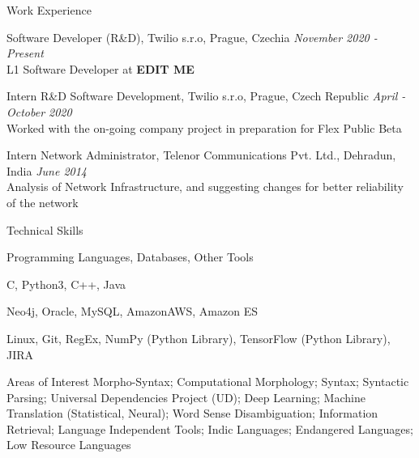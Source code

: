\documentclass{resume}
\begin{document}

\begin{rSection}{Work Experience}

    {Software Developer (R\&D), Twilio s.r.o, Prague, Czechia}
        \hfill {\em November 2020 - Present}\\
            L1 Software Developer at \textbf{EDIT ME}
            
    {Intern R\&D Software Development, Twilio s.r.o, Prague, Czech Republic}
        \hfill {\em April - October 2020}\\
            Worked with the on-going company project in preparation for Flex 
            Public Beta

    {Intern Network Administrator, Telenor Communications Pvt. Ltd., Dehradun, 
    India}
        \hfill {\em June 2014}\\
            Analysis of Network Infrastructure, and suggesting changes for 
            better reliability of the network

\end{rSection}



\begin{rSection}{Technical Skills}

\begin{rSubsection}{Programming Languages, Databases, Other Tools}{}{}{}
\item C, Python3, C++, Java
\item Neo4j, Oracle, MySQL, AmazonAWS, Amazon ES
\item Linux, Git, RegEx, NumPy (Python Library), TensorFlow (Python Library), JIRA
\end{rSubsection}

\begin{rSubsection}{Areas of Interest}{}{}{}
    Morpho-Syntax; Computational Morphology; Syntax; Syntactic Parsing; 
    Universal Dependencies Project (UD); Deep Learning; Machine Translation 
    (Statistical, Neural); Word Sense Disambiguation; Information Retrieval; 
    Language Independent Tools; Indic Languages; Endangered Languages; Low 
    Resource Languages
\end{rSubsection}

\end{rSection}
\end{document}
